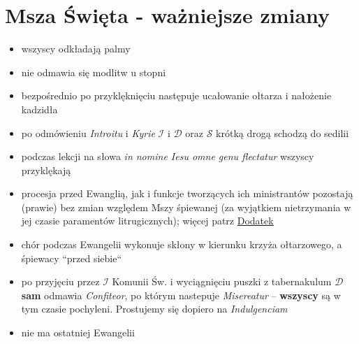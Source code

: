 \section{Msza Święta - ważniejsze zmiany}
\begin{itemize}
	\item wszyscy odkładają palmy
	\item nie odmawia się modlitw u stopni
	\item bezpośrednio po przyklęknięciu następuje ucałowanie ołtarza i
	      nałożenie kadzidła
	\item po odmówieniu \textit{Introitu} i \textit{Kyrie} $\mathcal{I}$ i
	      $\mathcal{D}$ oraz $\mathcal{S}$ krótką drogą schodzą do sedilii
	\item podczas lekcji na słowa \textit{in nomine Iesu omne genu flectatur}
	      wszyscy przyklękają
	\item procesja przed Ewanglią, jak i funkcje tworzących ich ministrantów
	      pozostają (prawie) bez zmian względem Mszy śpiewanej (za wyjątkiem
	      nietrzymania w jej czasie paramentów litrugicznych); więcej patrz
	      \hyperref[E]{Dodatek}
	\item chór podczas Ewangelii wykonuje skłony w kierunku krzyża ołtarzowego,
	      a śpiewacy ``przed siebie``
	\item po przyjęciu przez $\mathcal{I}$ Komunii Św. i wyciągnięciu puszki z
	      tabernakulum $\mathcal{D}$ \textbf{sam} odmawia \textit{Confiteor}, po
	      którym nastepuje \textit{Misereatur} -- \textbf{wszyscy} są w tym
	      czasie pochyleni. Prostujemy się dopiero na \textit{Indulgenciam}
	\item nie ma ostatniej Ewangelii

\end{itemize}